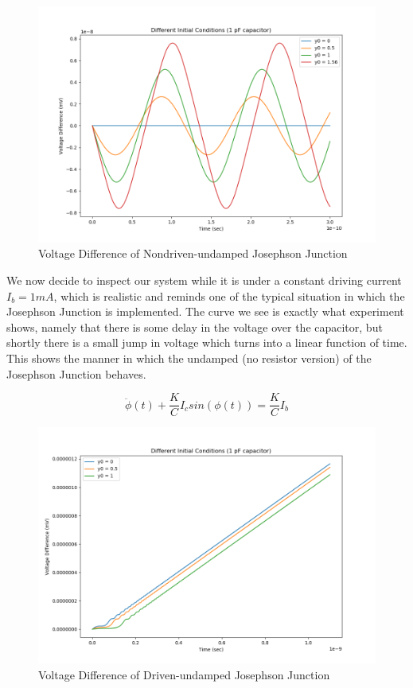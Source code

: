 \documentclass[12pt]{article}
\begin{document}
\begin{figure}
\caption{Voltage Difference of Nondriven-undamped Josephson Junction}
\begin{center}
\includegraphics[scale=0.60]{uud-jjinitv.png}
\end{center}
\end{figure}


We now decide to inspect our system while it is under a constant driving current $I_b=1mA$, which is realistic and reminds one of the typical situation in which the Josephson Junction is implemented.  The curve we see is exactly what experiment shows, namely that there is some delay in the voltage over the capacitor, but shortly there is a small jump in voltage which turns into a linear function of time.  This shows the manner in which the undamped (no resistor version) of the Josephson Junction behaves.

\begin{equation}
\ddot{\phi}(t) + \dfrac{K}{C} I_c sin(\phi(t)) = \dfrac{K}{C} I_b
\end{equation}

\begin{figure}
\caption{Voltage Difference of Driven-undamped Josephson Junction}
\begin{center}
\includegraphics[scale=0.60]{ud-jjinitv.png}
\end{center}
\end{figure}
\end{document}
